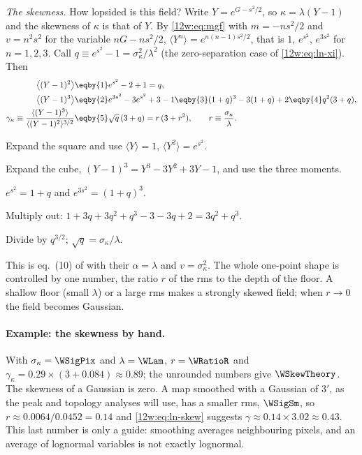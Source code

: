 \emph{The skewness.} How lopsided is this field? Write $Y=e^{G-s^2/2}$, so $\kappa=\lambda(Y-1)$ and the skewness
of $\kappa$ is that of $Y$. By \eqref{12w:eq:mgf} with $m=-ns^2/2$ and $v=n^2s^2$ for the variable $nG-ns^2/2$,
$\langle Y^n\rangle=e^{n(n-1)s^2/2}$, that is $1$, $e^{s^2}$, $e^{3s^2}$ for $n=1,2,3$. Call
$q\equiv e^{s^2}-1=\sigma_\kappa^2/\lambda^2$ (the zero-separation case of \eqref{12w:eq:ln-xi}). Then
\begin{align}
\bigl\langle(Y-1)^2\bigr\rangle&\eqby{1}e^{s^2}-2+1=q,
\nonumber\\
\bigl\langle(Y-1)^3\bigr\rangle&\eqby{2}e^{3s^2}-3e^{s^2}+3-1
\eqby{3}(1+q)^3-3(1+q)+2
\eqby{4}q^2(3+q),
\nonumber\\
\gamma_\kappa\equiv\frac{\langle(Y-1)^3\rangle}{\langle(Y-1)^2\rangle^{3/2}}
&\eqby{5}\sqrt q\,(3+q)=r\,(3+r^2),\qquad r\equiv\frac{\sigma_\kappa}{\lambda}.
\label{12w:eq:ln-skew}
\end{align}
\begin{explain}
  \item Expand the square and use $\langle Y\rangle=1$, $\langle Y^2\rangle=e^{s^2}$.
  \item Expand the cube, $(Y-1)^3=Y^3-3Y^2+3Y-1$, and use the three moments.
  \item $e^{s^2}=1+q$ and $e^{3s^2}=(1+q)^3$.
  \item Multiply out: $1+3q+3q^2+q^3-3-3q+2=3q^2+q^3$.
  \item Divide by $q^{3/2}$; $\sqrt q=\sigma_\kappa/\lambda$.
\end{explain}
This is eq.~(10) of \cite{Xavier2016} with their $\alpha=\lambda$ and $v=\sigma_\kappa^2$. The whole one-point
shape is controlled by one number, the ratio $r$ of the rms to the depth of the floor. A shallow floor (small
$\lambda$) or a large rms makes a strongly skewed field; when $r\to0$ the field becomes Gaussian.

\paragraph{Example: the skewness by hand.}
With $\sigma_\kappa=\WSigPix$ and $\lambda=\WLam$, $r=\WRatioR$ and $\gamma_\kappa=0.29\times(3+0.084)\approx0.89$;
the unrounded numbers give $\WSkewTheory$. The skewness of a Gaussian is zero. A map smoothed with a Gaussian of
$3'$, as the peak and topology analyses will use, has a smaller rms, $\WSigSm$, so $r\approx0.0064/0.0452=0.14$ and
\eqref{12w:eq:ln-skew} suggests $\gamma\approx0.14\times3.02\approx0.43$. This last number is only a guide:
smoothing averages neighbouring pixels, and an average of lognormal variables is not exactly lognormal.

